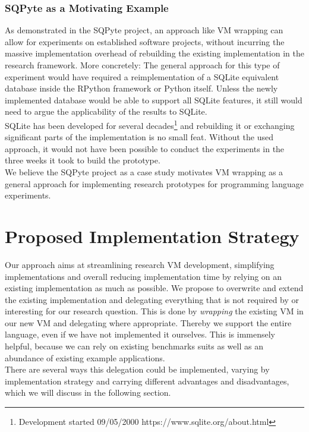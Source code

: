 \documentclass[preprint, nonatbib]{sigplanconf}
\begin{document}
\subsubsection{SQPyte as a Motivating Example}
As demonstrated in the SQPyte project, an approach like VM wrapping can allow for experiments on established software projects, without incurring the massive implementation overhead of rebuilding the existing implementation in the research framework. More concretely: The general approach for this type of experiment would have required a reimplementation of a SQLite equivalent database inside the RPython framework or Python itself. Unless the newly implemented database would be able to support all SQLite features, it still would need to argue the applicability of the results to SQLite. \\
SQLite has been developed for several decades\footnote{Development started 09/05/2000 https://www.sqlite.org/about.html} and rebuilding it or exchanging significant parts of the implementation is no small feat. Without the used approach, it would not have been possible to conduct the experiments in the three weeks it took to build the prototype.\\
We believe the SQPyte project as a case study motivates VM wrapping as a general approach for implementing research prototypes for programming language experiments.

\section{Proposed Implementation Strategy}
\label{section:implementation}
Our approach aims at streamlining research VM development, simplifying implementations and overall reducing implementation time by relying on an existing implementation as much as possible. We propose to overwrite and extend the existing implementation and delegating everything that is not required by or interesting for our research question. This is done by \emph{wrapping} the existing VM in our new VM and delegating where appropriate. Thereby we support the entire language, even if we have not implemented it ourselves. This is immensely helpful, because we can rely on existing benchmarks suits as well as an abundance of existing example applications.\\
There are several ways this delegation could be implemented, varying by implementation strategy and carrying different advantages and disadvantages, which we will discuss in the following section.
\end{document}

